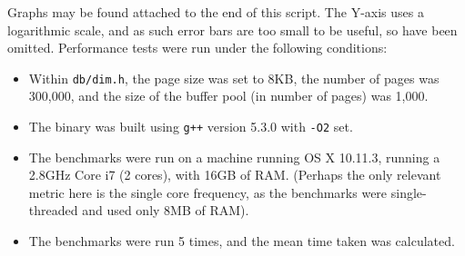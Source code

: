 Graphs may be found attached to the end of this script. The Y-axis uses a logarithmic scale, and as such error bars are too small to be useful, so have been omitted. Performance tests were run under the following conditions:

\begin{itemize}
  \item Within \texttt{db/dim.h}, the page size was set to 8KB, the number of pages was 300,000, and the size of the buffer pool (in number of pages) was 1,000.
  \item The binary was built using \texttt{g++} version 5.3.0 with \texttt{-O2} set.
  \item The benchmarks were run on a machine running OS X 10.11.3, running a 2.8GHz Core i7 (2 cores), with 16GB of RAM. (Perhaps the only relevant metric here is the single core frequency, as the benchmarks were single-threaded and used only 8MB of RAM).
  \item The benchmarks were run 5 times, and the mean time taken was calculated.
\end{itemize}
